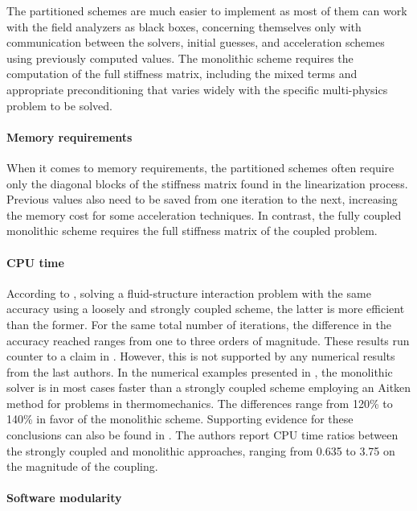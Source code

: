 The partitioned schemes are much easier to implement as most of them can work with the field analyzers as black boxes, concerning themselves only with communication between the solvers, initial guesses, and acceleration schemes using previously computed values.
The monolithic scheme requires the computation of the full stiffness matrix, including the mixed terms and appropriate preconditioning that varies widely with the specific multi-physics problem to be solved.

\paragraph{Memory requirements}

When it comes to memory requirements, the partitioned schemes often require only the diagonal blocks of the stiffness matrix found in the linearization process.
Previous values also need to be saved from one iteration to the next, increasing the memory cost for some acceleration techniques.
In contrast, the fully coupled monolithic scheme requires the full stiffness matrix of the coupled problem.

\paragraph{CPU time}

According to \cite{michler_efficient_2005}, solving a fluid-structure interaction problem with the same accuracy using a loosely and strongly coupled scheme, the latter is more efficient than the former.
For the same total number of iterations, the difference in the accuracy reached ranges from one to three orders of magnitude.
These results run counter to a claim in \cite{felippa_partitioned_2001}. However, this is not supported by any numerical results from the last authors.
In the numerical examples presented in \cite{danowski_computational_2014}, the monolithic solver is in most cases faster than a strongly coupled scheme employing an Aitken method for problems in thermomechanics.
The differences range from 120\% to 140\% in favor of the monolithic scheme.
Supporting evidence for these conclusions can also be found in \cite{novascone_evaluation_2015}.
The authors report  CPU time ratios between the strongly coupled and monolithic approaches, ranging from 0.635 to 3.75 on the magnitude of the coupling.

\paragraph{Software modularity}

